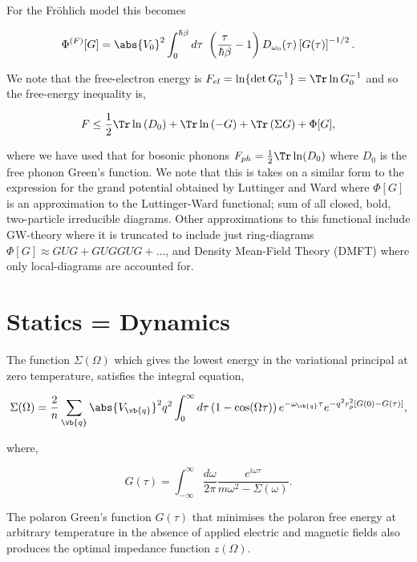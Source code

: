 For the Fr\"ohlich model this becomes

\begin{equation}
    \Phi^{(F)}[G] = \abs{V_0}^2 \int^{\hbar\beta}_0 d\tau\ \left(\frac{\tau}{\hbar\beta} - 1 \right) D_{\omega_0}(\tau) \left[G(\tau)\right]^{-1/2} .
\end{equation}

We note that the free-electron energy is $F_{el} = \ln\{\det G_0^{-1}\} = \Tr \ln G_0^{-1}$ and so the free-energy inequality is,

\begin{equation} \label{eqn:scfreeenergy}
    F \leq \frac{1}{2} \Tr \ln \left( D_0 \right) + \Tr \ln \left(-G\right) + \Tr\left(\Sigma G\right) + \Phi[G],
\end{equation}

where we have used that for bosonic phonons $F_{ph} = \frac{1}{2} \Tr \ln (D_0)$ where $D_0$ is the free phonon Green's function. We note that this is takes on a similar form to the expression for the grand potential obtained by Luttinger and Ward \cite{Luttinger1960} where $\Phi[G]$ is an approximation to the Luttinger-Ward functional; sum of all closed, bold, two-particle irreducible diagrams. Other approximations to this functional include GW-theory where it is truncated to include just ring-diagrams $\Phi[G] \approx GUG + GUGGUG + \dots$, and Density Mean-Field Theory (DMFT) where only local-diagrams are accounted for.

\section{Statics = Dynamics}

The function $\Sigma(\Omega)$ which gives the lowest energy in the variational principal at zero temperature, satisfies the integral equation,

\begin{equation}
    \Sigma(\Omega) = \frac{2}{n} \sum_{\vb{q}} \abs{V_{\vb{q}}}^2 q^2 \int^\infty_0 d\tau \left( 1 - \cos(\Omega \tau) \right)  e^{-\omega_{\vb{q}} \tau} e^{-q^2 r_p^2 [G(0) - G(\tau)]}, 
\end{equation}

where,

\begin{equation}
    G(\tau) = \int_{-\infty}^\infty \frac{d\omega}{2\pi} \frac{ e^{i \omega \tau} }{m \omega^2 - \Sigma(\omega)} .
\end{equation}

The polaron Green's function $G(\tau)$ that minimises the polaron free energy at arbitrary temperature in the absence of applied electric and magnetic fields also produces the optimal impedance function $z(\Omega)$. 
\newline

